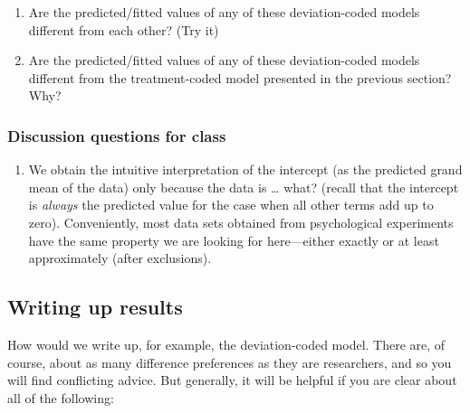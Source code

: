 \documentclass[
]{article}
\providecommand{\tightlist}{%
  \setlength{\itemsep}{0pt}\setlength{\parskip}{0pt}}
\begin{document}
\normalsize

\begin{enumerate}
\def\labelenumi{\arabic{enumi}.}
\setcounter{enumi}{1}
\tightlist
\item
  Are the predicted/fitted values of any of these deviation-coded models
  different from each other? (Try it)
\item
  Are the predicted/fitted values of any of these deviation-coded models
  different from the treatment-coded model presented in the previous
  section? Why?
\end{enumerate}

\hypertarget{discussion-questions-for-class}{%
\subsubsection{Discussion questions for
class}\label{discussion-questions-for-class}}

\begin{enumerate}
\def\labelenumi{\arabic{enumi}.}
\setcounter{enumi}{3}
\tightlist
\item
  We obtain the intuitive interpretation of the intercept (as the
  predicted grand mean of the data) only because the data is \ldots{}
  what? (recall that the intercept is \emph{always} the predicted value
  for the case when all other terms add up to zero). Conveniently, most
  data sets obtained from psychological experiments have the same
  property we are looking for here---either exactly or at least
  approximately (after exclusions).
\end{enumerate}

\hypertarget{writing-up-results-1}{%
\subsection{Writing up results}\label{writing-up-results-1}}

How would we write up, for example, the deviation-coded model. There
are, of course, about as many difference preferences as they are
researchers, and so you will find conflicting advice. But generally, it
will be helpful if you are clear about all of the following:
\end{document}
